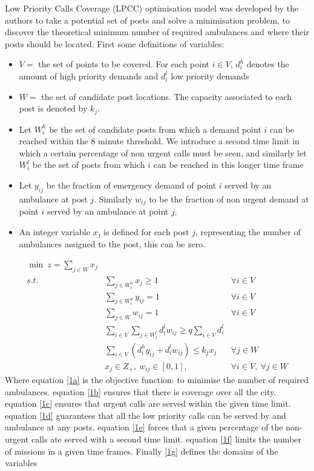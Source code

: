 \documentclass[11pt]{article} %
\begin{document}
Low Priority Calls Coverage (LPCC) optimisation model was developed by the authors to take a potential set of posts and solve a minimisation problem, to discover the theoretical minimum number of required ambulances and where their posts should be located. First some definitions of variables:
\begin{itemize}
	\item $V=$ the set of points to be covered. For each point $ i \in V $, $d_i^h$ denotes the amount of high priority demands and $d_i^l$ low priority demands 
	\item $ W= $ the set of candidate post locations. The capacity associated to each post is denoted by $ k_j $.
	\item Let $ W_i^h $ be the set of candidate posts from which a demand point $ i $ can be reached within the 8 minute threshold. 
	We introduce a second time limit in which a certain percentage of non urgent calls must be seen, and similarly let $ W_i^l $ be the set of posts from which $ i $ can be reached in this longer time frame
	\item Let $ y_{ij} $ be the fraction of emergency demand of point $ i  $ served by an ambulance at post $ j $. Similarly $ w_{ij} $ to be the fraction of non urgent demand at point $ i  $ served by an ambulance at point $ j $.
	\item An integer variable $ x_j $ is defined for each post $ j $, representing the number of ambulances assigned to the post, this can be zero.
\end{itemize}

\begin{eqnarray}
\min \ z=\sum_{j\in W} x_j \label{1a}\\
s.t.\ &\sum_{j\in W_i^h} x_j\geq1\ \ &\forall i \in V\label{1b}\\
&\sum_{j\in W_i^h} y_{ij}=1\ \ &\forall i \in V\label{1c}\\
&\sum_{j\in W}w_{ij}=1 \ \ & \forall i\in V \label{1d}\\
&\sum_{i \in V} \sum_{j \in W_i^l} d_i^l w_{ij} \geq q \sum_{i \in V} d_i^l\label{1e}\\
&\sum_{i \in V} (d_i^h y_{ij} +d_i^l w_{ij}) \leq k_jx_j & \forall j \in W\label{1f}\\
&x_j\in Z_+, \ w_{ij} \in [0,1], \ &\forall i \in V,\  \forall j \in W \label{1g}
\end{eqnarray}
Where equation \ref{1a} is the objective function: to minimise the number of required ambulances. equation \ref{1b} ensures that there is coverage over all the city. equation \ref{1c} ensures that urgent calls are served within the given time limit. equation \ref{1d} guarantees that all the low priority calls can be served by and ambulance at any posts. equation \ref{1e} forces that a given percentage of the non-urgent calls ate served with a second time limit. equation \ref{1f} limits the number of missions in a given time frames. Finally \ref{1g} defines the domains of the variables 
 
\end{document}
